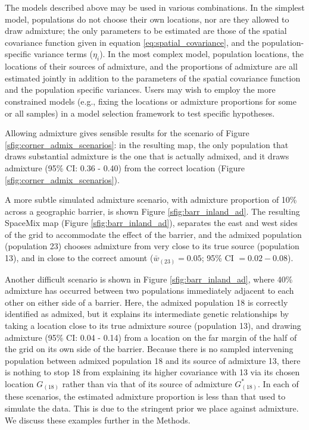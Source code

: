 \documentclass[12pt]{article}
\newcommand{\kadmixsource}[1]{{$G^{*}_{#1}$}}
\begin{document}
The models described above may be used in various combinations.  In the simplest model, populations do not choose their own locations, nor are they allowed to draw admixture; the only parameters to be estimated are those of the spatial covariance function given in equation \eqref{eq:spatial_covariance}, and the population-specific variance terms ($\eta_i$).  In the most complex model, population locations, the locations of their sources of admixture, and the proportions of admixture are all estimated jointly in addition to the parameters of the spatial covariance function and the population specific variances.  Users may wish to employ the more constrained models (e.g., fixing the locations or admixture proportions for some or all samples) in a model selection framework to test specific hypotheses.

Allowing admixture gives sensible results for the scenario of Figure \ref{sfig:corner_admix_scenarios}:
in the resulting map,
the only population that draws substantial admixture is the one that is actually admixed, 
and it draws admixture (95\% CI: 0.36 - 0.40) from the correct location (Figure \ref{sfig:corner_admix_scenarios}).

A more subtle simulated admixture scenario, with admixture proportion of 10\% across a geographic barrier, 
is shown Figure \ref{sfig:barr_inland_ad}.  
The resulting SpaceMix map (Figure \ref{sfig:barr_inland_ad}), 
separates the east and west sides of the grid to accommodate the effect of the barrier,
and the admixed population (population 23) chooses admixture from very close to its true source (population 13), 
and in close to the correct amount ($\bar{w}_{(23)} = 0.05$; 95\% CI $= 0.02-0.08$).

Another difficult scenario is shown in Figure \ref{sfig:barr_inland_ad},
where 40\% admixture has occurred between two populations immediately adjacent to each other on either side of a barrier.  
Here, the admixed population 18 is correctly identified as admixed, 
but it explains its intermediate genetic relationships by taking a location close to its true admixture source (population 13), 
and drawing admixture (95\% CI: 0.04 - 0.14) from a location on the far margin of the half of the grid on its own side of the barrier.
Because there is no sampled intervening population between admixed population 18 and its source of admixture 13, there is nothing to stop 18 from explaining its higher covariance with 13 via its chosen location $G_{(18)}$ rather than via that of its source of admixture \kadmixsource{(18)}.  
In each of these scenarios, the estimated admixture proportion is less than that used to simulate the data.  This is due to the stringent prior we place against admixture.  We discuss these examples further in the Methods.
\end{document}
